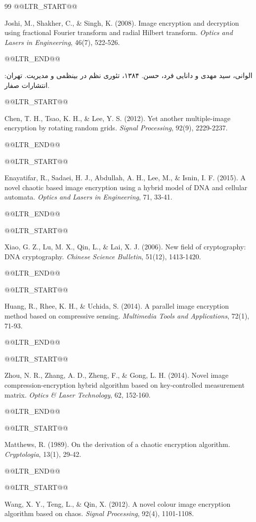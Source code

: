 \begin{thebibliography}{99}
@@LTR_START@@

 Joshi, M., Shakher, C., \& Singh, K. (2008). Image encryption and decryption using fractional Fourier transform and radial Hilbert transform. \textit{Optics and Lasers in Engineering}, 46(7), 522-526.

@@LTR_END@@

 الوانی، سید مهدی و دانایی فرد، حسن. ۱۳۸۴، تئوری نظم در بینظمی و مدیریت. تهران: انتشارات صفار.

@@LTR_START@@

 Chen, T. H., Tsao, K. H., \& Lee, Y. S. (2012). Yet another multiple-image encryption by rotating random grids. \textit{Signal Processing}, 92(9), 2229-2237.

@@LTR_END@@

@@LTR_START@@

 Enayatifar, R., Sadaei, H. J., Abdullah, A. H., Lee, M., \& Isnin, I. F. (2015). A novel chaotic based image encryption using a hybrid model of DNA and cellular automata. \textit{Optics and Lasers in Engineering}, 71, 33-41.

@@LTR_END@@

@@LTR_START@@

 Xiao, G. Z., Lu, M. X., Qin, L., \& Lai, X. J. (2006). New field of cryptography: DNA cryptography. \textit{Chinese Science Bulletin}, 51(12), 1413-1420.

@@LTR_END@@

@@LTR_START@@

 Huang, R., Rhee, K. H., \& Uchida, S. (2014). A parallel image encryption method based on compressive sensing. \textit{Multimedia Tools and Applications}, 72(1), 71-93.

@@LTR_END@@

@@LTR_START@@

 Zhou, N. R., Zhang, A. D., Zheng, F., \& Gong, L. H. (2014). Novel image compression-encryption hybrid algorithm based on key-controlled measurement matrix. \textit{Optics \& Laser Technology}, 62, 152-160.

@@LTR_END@@

@@LTR_START@@

 Matthews, R. (1989). On the derivation of a chaotic encryption algorithm. \textit{Cryptologia}, 13(1), 29-42.

@@LTR_END@@

@@LTR_START@@

 Wang, X. Y., Teng, L., \& Qin, X. (2012). A novel colour image encryption algorithm based on chaos. \textit{Signal Processing}, 92(4), 1101-1108.


\end{thebibliography}
